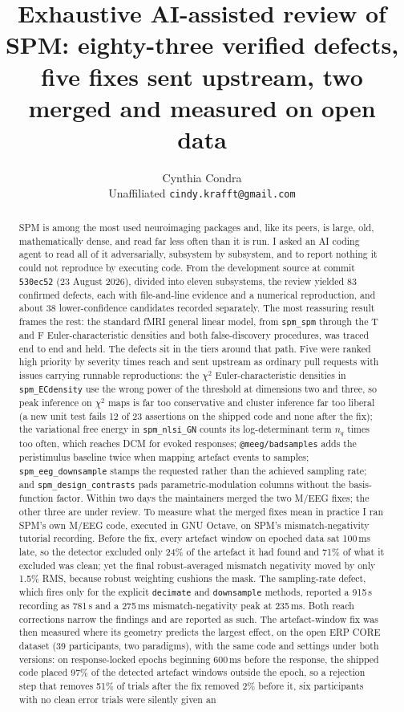\documentclass[11pt]{article}
\title{\textbf{Exhaustive AI-assisted review of SPM: eighty-three verified defects,\\ five fixes sent upstream, two merged and measured on open data}}
\author{Cynthia Condra\\ \small Unaffiliated \quad \texttt{cindy.krafft@gmail.com}}
\newcommand{\code}[1]{\texttt{#1}}
\begin{document}
\maketitle

\begin{abstract}
SPM is among the most used neuroimaging packages and, like its peers, is large, old, mathematically dense, and read far less often than it is run. I asked an AI coding agent to read all of it adversarially, subsystem by subsystem, and to report nothing it could not reproduce by executing code. From the development source at commit \code{530ec52} (23 August 2026), divided into eleven subsystems, the review yielded 83 confirmed defects, each with file-and-line evidence and a numerical reproduction, and about 38 lower-confidence candidates recorded separately. The most reassuring result frames the rest: the standard fMRI general linear model, from \code{spm\_spm} through the T and F Euler-characteristic densities and both false-discovery procedures, was traced end to end and held. The defects sit in the tiers around that path. Five were ranked high priority by severity times reach and sent upstream as ordinary pull requests with issues carrying runnable reproductions: the $\chi^2$ Euler-characteristic densities in \code{spm\_ECdensity} use the wrong power of the threshold at dimensions two and three, so peak inference on $\chi^2$ maps is far too conservative and cluster inference far too liberal (a new unit test fails 12 of 23 assertions on the shipped code and none after the fix); the variational free energy in \code{spm\_nlsi\_GN} counts its log-determinant term $n_q$ times too often, which reaches DCM for evoked responses; \code{@meeg/badsamples} adds the peristimulus baseline twice when mapping artefact events to samples; \code{spm\_eeg\_downsample} stamps the requested rather than the achieved sampling rate; and \code{spm\_design\_contrasts} pads parametric-modulation columns without the basis-function factor. Within two days the maintainers merged the two M/EEG fixes; the other three are under review. To measure what the merged fixes mean in practice I ran SPM's own M/EEG code, executed in GNU Octave, on SPM's mismatch-negativity tutorial recording. Before the fix, every artefact window on epoched data sat 100\,ms late, so the detector excluded only 24\% of the artefact it had found and 71\% of what it excluded was clean; yet the final robust-averaged mismatch negativity moved by only 1.5\% RMS, because robust weighting cushions the mask. The sampling-rate defect, which fires only for the explicit \code{decimate} and \code{downsample} methods, reported a 915\,s recording as 781\,s and a 275\,ms mismatch-negativity peak at 235\,ms. Both reach corrections narrow the findings and are reported as such. The artefact-window fix was then measured where its geometry predicts the largest effect, on the open ERP CORE dataset (39 participants, two paradigms), with the same code and settings under both versions: on response-locked epochs beginning 600\,ms before the response, the shipped code placed 97\% of the detected artefact windows outside the epoch, so a rejection step that removes 51\% of trials after the fix removed 2\% before it, six participants with no clean error trials were silently given an 
\end{abstract}
\end{document}
